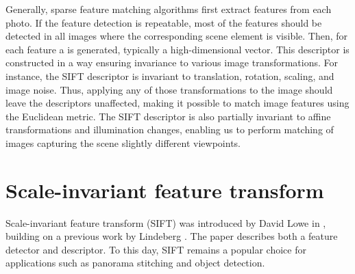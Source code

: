 Generally, sparse feature matching algorithms first extract features from each photo. %
If the feature detection is repeatable, most of the features should be detected in all images where the corresponding scene element is visible.
Then, for each feature a  is generated, typically a high-dimensional vector. 
This descriptor is constructed in a way ensuring invariance to various image transformations. 
For instance, the SIFT descriptor is invariant to translation, rotation, scaling, and image noise. 
Thus, applying any of those transformations to the image should leave the descriptors unaffected, making it possible to match image features using the Euclidean metric. 
The SIFT descriptor is also partially invariant to affine transformations and illumination changes, enabling us to perform matching of images capturing the scene slightly different viewpoints.
 
\section{Scale-invariant feature transform}
Scale-invariant feature transform (SIFT) was introduced by David Lowe in \cite{lowe1999}, building on a previous work by Lindeberg \cite{lindeberg1998}.  %
The paper describes both a feature detector and descriptor.
To this day, SIFT remains a popular choice for applications such as panorama stitching and object detection.

